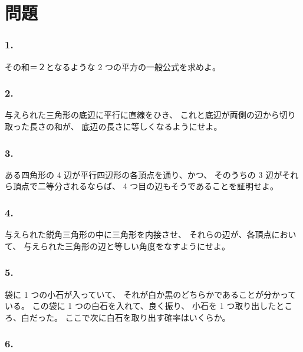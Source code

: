 \chapter{問題}

\subsection*{1.}

 その和＝２となるような 2 つの平方の一般公式を求めよ。
\begin{flushright}
[24/3/84]
\end{flushright}

\subsection*{2.}
 与えられた三角形の底辺に平行に直線をひき、
これと底辺が両側の辺から切り取った長さの和が、
底辺の長さに等しくなるようにせよ。

\subsection*{3.}
  ある四角形の 4 辺が平行四辺形の各頂点を通り、かつ、
そのうちの 3 辺がそれら頂点で二等分されるならば、
 4 つ目の辺もそうであることを証明せよ。

\subsection*{4.}
  与えられた鋭角三角形の中に三角形を内接させ、
それらの辺が、各頂点において、
与えられた三角形の辺と等しい角度をなすようにせよ。
\begin{flushright}
[19/4/76]
\end{flushright}


\subsection*{5.}

袋に 1 つの小石が入っていて、
それが白か黒のどちらかであることが分かっている。
この袋に 1 つの白石を入れて、良く振り、
小石を 1 つ取り出したところ、白だった。
ここで次に白石を取り出す確率はいくらか。
\begin{flushright}
[8/9/87]
\end{flushright}

\subsection*{6.}

